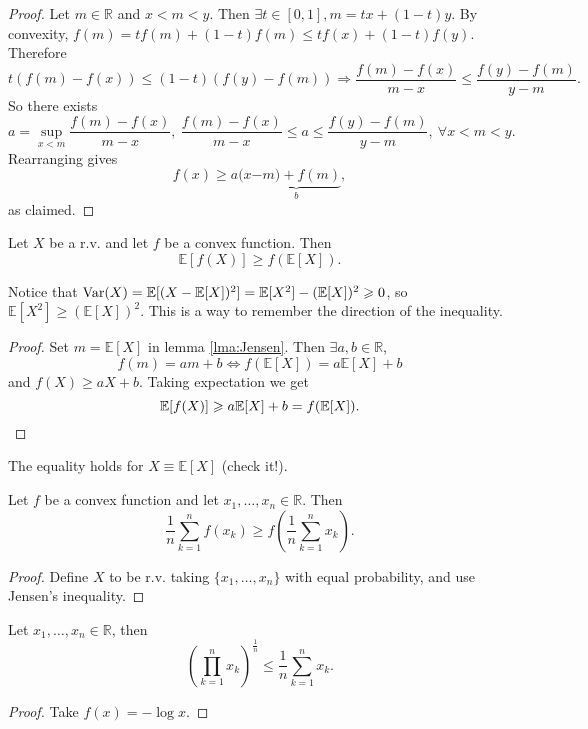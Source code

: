 \begin{proof}
    Let $m\in \mathbb{R}$ and $ x<m<y $. Then $ \exists t\in [0,1], m=tx+(1-t)y $. By convexity, $ f(m)=tf(m)+(1-t)f(m)\le tf(x)+(1-t)f(y) $. Therefore 
    \[
        t(f(m)-f(x))\le (1-t)(f(y)-f(m)) \Longrightarrow \frac{f(m)-f(x)}{m-x}\le \frac{f(y)-f(m)}{y-m}.
    \]
    So there exists
    \[
        a= \sup_{x<m} \frac{f(m)-f(x)}{m-x},  \ \frac{f(m)-f(x)}{m-x}\le a\le \frac{f(y)-f(m)}{y-m},\ \forall x<m<y.
    \]
    Rearranging gives 
    \[
        f(x)\ge a(x \underbrace{-m)+f(m)}_{b},
    \]
    as claimed.
\end{proof}
\begin{proposition}\label{prop:Jensen's inequality}
    Let $X$ be a r.v. and let $f$ be a convex function. Then 
    \[
        \mathbb{E}[f(X)]\ge f(\mathbb{E}[X]).
    \]
\end{proposition}
\begin{note}
    Notice that $ \var(X)=\mathbb{E}[(X-\mathbb{E}[X])^2]=\mathbb{E}[X^2]-(\mathbb{E}[X])^2\ge 0 $, so $ \mathbb{E}[X^2]\ge (\mathbb{E}[X])^2 $. This is a way to remember the direction of the inequality.
\end{note}
\begin{proof}
    Set $ m=\mathbb{E}[X] $ in lemma \ref{lma:Jensen}. Then $ \exists a,b\in \mathbb{R} $, 
    \[
        f(m)=am+b \Longleftrightarrow f(\mathbb{E}[X])=a\mathbb{E}[X]+b
    \]
    and $ f(X)\ge aX+b $. Taking expectation we get 
    \[
        \mathbb{E}[f(X)]\ge a\mathbb{E}[X]+b=f(\mathbb{E}[X]).\qedhere
    \]
\end{proof}
\begin{remark}
    The equality holds for $ X\equiv \mathbb{E}[X] $ (check it!).
\end{remark}
\begin{corollary}
    Let $f$ be a convex function and let $ x_1,\dots,x_n\in \mathbb{R}  $. Then 
    \[
        \frac{1}{n}\sum_{k=1}^{n} f(x_k)\ge f\left( \frac{1}{n}\sum_{k=1}^{n}x_k \right).
    \]
\end{corollary}
\begin{proof}
    Define $X$ to be r.v. taking $ \{x_1,\dots,x_n\} $ with equal probability, and use Jensen's inequality.
\end{proof}
\begin{corollary}[AM-GM inequality]\label{prop:AM-GM inequality}
    Let $ x_1,\dots,x_n\in \mathbb{R}  $, then 
    \[
        \left( \prod_{k=1}^{n} x_k\right)^{\frac1n}\le \frac{1}{n}\sum_{k=1}^{n}x_k.
    \]
\end{corollary}
\begin{proof}
    Take $f(x)=-\log x$.
\end{proof}

